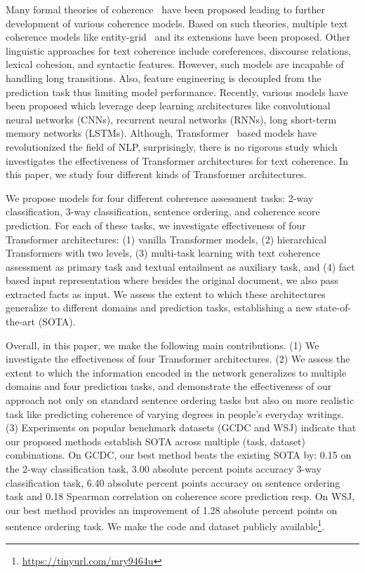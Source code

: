 \documentclass[11pt]{article}
\begin{document}
Many formal theories of coherence~\cite{grosz1995centering,mann1988rhetorical,asher2003logics} have been proposed leading to further development of various coherence models. Based on such theories, multiple text coherence models like entity-grid~\cite{barzilay2008modeling} and its extensions have been proposed. Other linguistic approaches for text coherence include coreferences, discourse relations, lexical cohesion, and syntactic features.  However, such models are incapable of handling long transitions. Also, feature engineering is decoupled from the prediction task thus limiting model performance. Recently, various models have been proposed which leverage deep learning architectures like convolutional neural networks (CNNs), recurrent neural networks (RNNs), long short-term memory networks (LSTMs). Although, Transformer~\cite{vaswani2017attention} based models have revolutionized the field of NLP, surprisingly, there is no rigorous study which investigates the effectiveness of Transformer architectures for text coherence. In this paper, we study four different kinds of Transformer architectures.

We propose models for four different coherence assessment tasks: 2-way classification, 3-way classification, sentence ordering, and coherence score prediction. For each of these tasks, we investigate effectiveness of four Transformer architectures: (1) vanilla Transformer models, (2) hierarchical Transformers with two levels, (3) multi-task learning with text coherence assessment as primary task and textual entailment as auxiliary task, and (4) fact based input representation where besides the original document, we also pass extracted facts as input. We assess the extent to which these architectures generalize to different domains and prediction tasks, establishing a new state-of-the-art (SOTA).

Overall, in this paper, we make the following main contributions. (1)
We investigate the effectiveness of four Transformer architectures. (2) We assess the extent to which the information encoded in the network generalizes to multiple domains and four prediction tasks, and demonstrate the effectiveness of our approach not only on standard sentence ordering tasks but also on more realistic task like predicting coherence of varying degrees in people's everyday writings. (3) Experiments on popular benchmark datasets (GCDC and WSJ) indicate that our proposed methods establish SOTA across multiple (task, dataset) combinations. On GCDC, our best method beats the existing SOTA by: 0.15  on the 2-way classification task, 3.00 absolute percent points accuracy 3-way classification task, 6.40 absolute percent points accuracy on sentence ordering task and 0.18 Spearman correlation on coherence score prediction resp. On WSJ, our best method provides an improvement of 1.28 absolute percent points on sentence ordering task. We make the code and dataset publicly available\footnote{\url{https://tinyurl.com/mry9464u}}.
\end{document}
